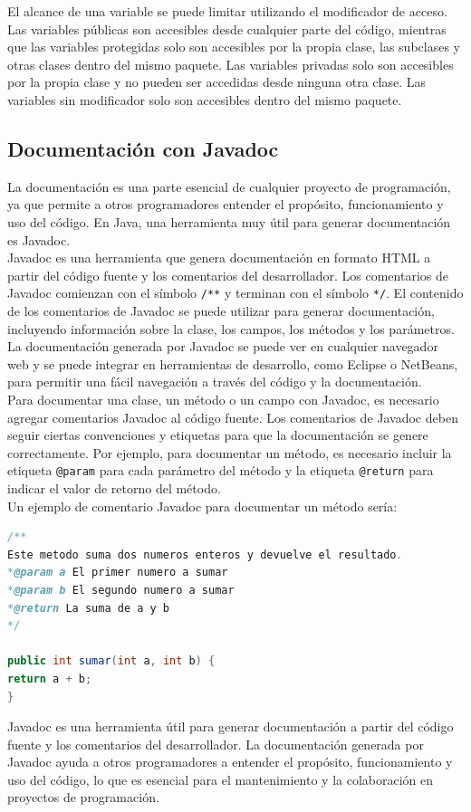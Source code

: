 \documentclass[executivepaper]{article}
\begin{document}
El alcance de una variable se puede limitar utilizando el modificador de acceso.  Las variables públicas son accesibles desde cualquier parte del código, mientras que las variables protegidas solo son accesibles por la propia clase, las subclases y otras clases dentro del mismo paquete. Las variables privadas solo son accesibles por la propia clase y no pueden ser accedidas desde ninguna otra clase. Las variables sin modificador solo son accesibles dentro del mismo paquete.



\subsection{Documentación con Javadoc}
La documentación es una parte esencial de cualquier proyecto de programación, ya que permite a otros programadores entender el propósito, funcionamiento y uso del código. En Java, una herramienta muy útil para generar documentación es Javadoc.\\

Javadoc es una herramienta que genera documentación en formato HTML a partir del código fuente y los comentarios del desarrollador. Los comentarios de Javadoc comienzan con el símbolo \texttt{/**} y terminan con el símbolo \texttt{*/}. El contenido de los comentarios de Javadoc se puede utilizar para generar documentación, incluyendo información sobre la clase, los campos, los métodos y los parámetros.\\

La documentación generada por Javadoc se puede ver en cualquier navegador web y se puede integrar en herramientas de desarrollo, como Eclipse o NetBeans, para permitir una fácil navegación a través del código y la documentación.\\

Para documentar una clase, un método o un campo con Javadoc, es necesario agregar comentarios Javadoc al código fuente. Los comentarios de Javadoc deben seguir ciertas convenciones y etiquetas para que la documentación se genere correctamente. Por ejemplo, para documentar un método, es necesario incluir la etiqueta \texttt{@param} para cada parámetro del método y la etiqueta \texttt{@return} para indicar el valor de retorno del método.\\

Un ejemplo de comentario Javadoc para documentar un método sería:\\
\begin{lstlisting}[language=Java]
/**
Este metodo suma dos numeros enteros y devuelve el resultado.
*@param a El primer numero a sumar
*@param b El segundo numero a sumar
*@return La suma de a y b
*/

public int sumar(int a, int b) {
return a + b;
}
\end{lstlisting}
Javadoc es una herramienta útil para generar documentación a partir del código fuente y los comentarios del desarrollador. La documentación generada por Javadoc ayuda a otros programadores a entender el propósito, funcionamiento y uso del código, lo que es esencial para el mantenimiento y la colaboración en proyectos de programación.
\end{document}

